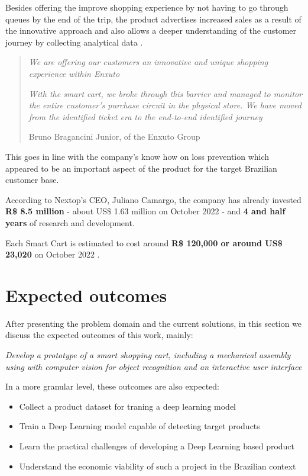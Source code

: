 \documentclass[openright]{normas-utf-tex} %
\begin{document}
Besides offering the improve shopping experience by not having to go through queues by the end of the trip, the product advertises increased sales
as a result of the innovative approach and also allows a deeper understanding of the customer journey by collecting analytical data \cite{Paraiba2022}.

\begin{quote}
\textit{We are offering our customers an innovative and unique shopping experience within Enxuto}

\textit{With the smart cart, we broke through this barrier and managed to monitor the
entire customer's purchase circuit in the physical store. We have moved
from the identified ticket era to the end-to-end identified journey}

    Bruno Bragancini Junior,  of the Enxuto Group \cite{Paraiba2022}
\end{quote}


This goes in line with the
company's know how on loss prevention which appeared to be an important aspect
of the product for the target Brazilian customer base.


According to Nextop's CEO, Juliano Camargo, the company has already invested \textbf{R\$ 8.5 million} - about US\$ 1.63 million on October 2022 - and \textbf{4 and half years}
of research and development.

Each Smart Cart is estimated to cost around \textbf{R\$ 120,000  or around US\$ 23,020} on October 2022 \cite{Paraiba2022}.

\section{Expected outcomes}

After presenting the problem domain and the current solutions, in this section we discuss the expected
outcomes of this work, mainly:

\textit{Develop a prototype of a smart shopping cart, including a mechanical assembly using with computer vision for object recognition
and an interactive user interface}

In a more granular level, these outcomes are also expected:

\begin{itemize}
    \item Collect a product dataset for traning a deep learning model
    \item Train a Deep Learning model capable of detecting target products
	\item Learn the practical challenges of developing a Deep Learning based product
    \item Understand the economic viability of such a project in the Brazilian context
\end{itemize}
\end{document}
